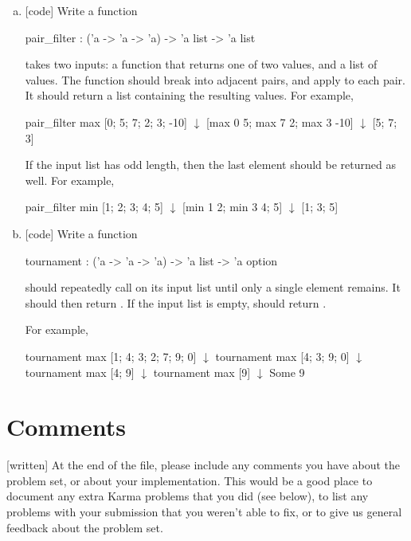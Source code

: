 \documentclass{pset}
\begin{document}
\exercise{}
\begin{enumerate}[(a)]
\item{} [code] Write a function
\begin{ocaml}
pair_filter : ('a -> 'a -> 'a) -> 'a list -> 'a list
\end{ocaml}
 takes two inputs: a function  that
returns one of two values, and a list  of values.  The
 function should break  into adjacent
pairs, and apply  to each pair.  It should return a list
containing the resulting values.  For example,
\begin{ocaml}
pair_filter max [0; 5; 7; 2; 3; -10]
  $\downarrow$ [max 0 5; max 7 2; max 3 -10]
  $\downarrow$ [5; 7; 3]
\end{ocaml}

If the input list has odd length, then the last element should be
returned as well.  For example,
\begin{ocaml}
pair_filter min [1; 2; 3; 4; 5]
  $\downarrow$ [min 1 2; min 3 4; 5]
  $\downarrow$ [1; 3; 5]
\end{ocaml}

\item{} [code] Write a function
\begin{ocaml}
tournament : ('a -> 'a -> 'a) -> 'a list -> 'a option
\end{ocaml}
 should repeatedly call  on its input
list until only a single element  remains.  It should then return
.  If the input list is empty,  should
return .

For example,
\begin{ocaml}
tournament max [1; 4; 3; 2; 7; 9; 0]
  $\downarrow$ tournament max [4; 3; 9; 0]
  $\downarrow$ tournament max [4; 9]
  $\downarrow$ tournament max [9]
  $\downarrow$ Some 9
\end{ocaml}

\end{enumerate}

\section*{Comments}

[written] At the end of the file, please include any comments you have about
the problem set, or about your implementation.  This would be a good place to
document any extra Karma problems that you did (see below), to list any
problems with your submission that you weren't able to fix, or to give us
general feedback about the problem set.
\end{document}
